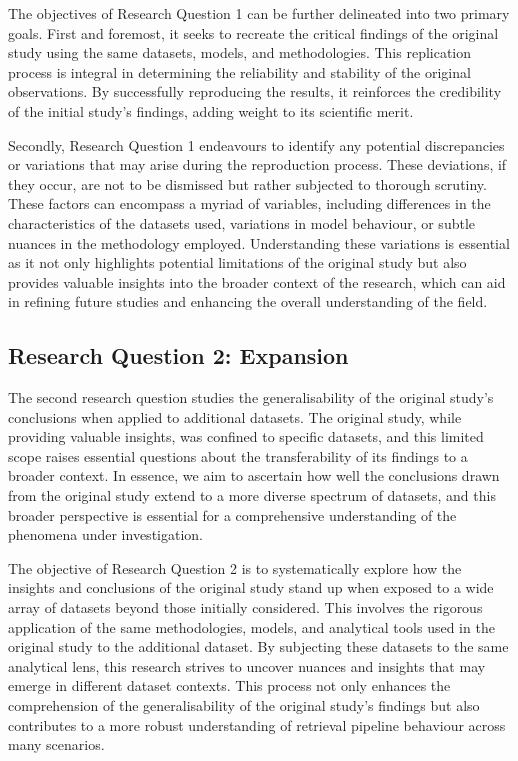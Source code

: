 The objectives of Research Question 1 can be further delineated into two primary goals. First and foremost, it seeks to recreate the critical findings of the original study using the same datasets, models, and methodologies. This replication process is integral in determining the reliability and stability of the original observations. By successfully reproducing the results, it reinforces the credibility of the initial study's findings, adding weight to its scientific merit.

Secondly, Research Question 1 endeavours to identify any potential discrepancies or variations that may arise during the reproduction process. These deviations, if they occur, are not to be dismissed but rather subjected to thorough scrutiny. These factors can encompass a myriad of variables, including differences in the characteristics of the datasets used, variations in model behaviour, or subtle nuances in the methodology employed. Understanding these variations is essential as it not only highlights potential limitations of the original study but also provides valuable insights into the broader context of the research, which can aid in refining future studies and enhancing the overall understanding of the field.

\subsection{Research Question 2: Expansion}
The second research question studies the generalisability of the original study's conclusions when applied to additional datasets. The original study, while providing valuable insights, was confined to specific datasets, and this limited scope raises essential questions about the transferability of its findings to a broader context. In essence, we aim to ascertain how well the conclusions drawn from the original study extend to a more diverse spectrum of datasets, and this broader perspective is essential for a comprehensive understanding of the phenomena under investigation.

The objective of Research Question 2 is to systematically explore how the insights and conclusions of the original study stand up when exposed to a wide array of datasets beyond those initially considered. This involves the rigorous application of the same methodologies, models, and analytical tools used in the original study to the additional dataset. By subjecting these datasets to the same analytical lens, this research strives to uncover nuances and insights that may emerge in different dataset contexts. This process not only enhances the comprehension of the generalisability of the original study's findings but also contributes to a more robust understanding of retrieval pipeline behaviour across many scenarios.

